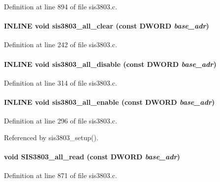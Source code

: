 Definition at line 894 of file sis3803.c.
\paragraph[{sis3803\_\-all\_\-clear}]{\setlength{\rightskip}{0pt plus 5cm}INLINE void sis3803\_\-all\_\-clear (const {\bf DWORD} {\em base\_\-adr})}\hfill\label{sis3803_8c_a7856301d46bb906f5403aebcd7ccd355}


Definition at line 242 of file sis3803.c.
\paragraph[{sis3803\_\-all\_\-disable}]{\setlength{\rightskip}{0pt plus 5cm}INLINE void sis3803\_\-all\_\-disable (const {\bf DWORD} {\em base\_\-adr})}\hfill\label{sis3803_8c_adc24acae1b06711b0c7813e130f8c2c3}


Definition at line 314 of file sis3803.c.
\paragraph[{sis3803\_\-all\_\-enable}]{\setlength{\rightskip}{0pt plus 5cm}INLINE void sis3803\_\-all\_\-enable (const {\bf DWORD} {\em base\_\-adr})}\hfill\label{sis3803_8c_aca0ca9d752bc20f236708673224dd7a5}


Definition at line 296 of file sis3803.c.

Referenced by sis3803\_\-setup().
\paragraph[{SIS3803\_\-all\_\-read}]{\setlength{\rightskip}{0pt plus 5cm}void SIS3803\_\-all\_\-read (const {\bf DWORD} {\em base\_\-adr})}\hfill\label{sis3803_8c_a0d6375b5ccb63e1058fe47cdefaddc97}


Definition at line 871 of file sis3803.c.
